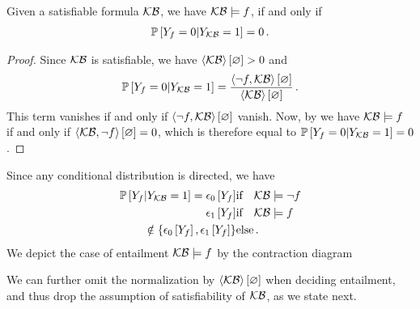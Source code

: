 %
\begin{theorem}
    \label{the:probEntailment}
    Given a satisfiable formula $\mathcal{KB}$, we have $\mathcal{KB}\models f$, if and only if
    \begin{align*}
        \mathbb{P}\left[Y_{f}=0|Y_{\mathcal{KB}}=1\right] = 0 \, .
    \end{align*}
\end{theorem}
\begin{proof}
    Since $\mathcal{KB}$ is satisfiable, we have $\left\langle \mathcal{KB}\right\rangle \left[ \varnothing \right]>0$ and
    \[ \mathbb{P}\left[Y_{f}=0|Y_{\mathcal{KB}}=1\right] = \frac{\left\langle \lnot f,\mathcal{KB}\right\rangle \left[ \varnothing \right]}{\left\langle \mathcal{KB}\right\rangle \left[ \varnothing \right]} \, .  \]
    This term vanishes if and only if $\left\langle \lnot f,\mathcal{KB}\right\rangle \left[ \varnothing \right]$ vanish.
    Now, by  we have $\mathcal{KB}\models f$ if and only if $\left\langle \mathcal{KB},\lnot f\right\rangle \left[ \varnothing \right]=0$, which is therefore equal to $\mathbb{P}\left[Y_{f}=0|Y_{\mathcal{KB}}=1\right]=0$.
\end{proof}

Since any conditional distribution is directed, we have
\begin{align}
    \condprobof{\formulavar}{\kbvar=1} = %
    \fbasisat{\formulavar}  & \text{if} \quad \kb\models\lnot\exformula \\
    \tbasisat{\formulavar}  & \text{if} \quad \kb\models\exformula \\
    \notin \{\fbasisat{\formulavar},\tbasisat{\formulavar}\} & \text{else}
    \, .
\end{align}
We depict the case of entailment $\mathcal{KB}\models f$ by the contraction diagram
\begin{center}
    
\end{center}

We can further omit the normalization by $\left\langle \mathcal{KB}\right\rangle \left[ \varnothing \right]$ when deciding entailment, and thus drop the assumption of satisfiability of $\mathcal{KB}$, as we state next.


